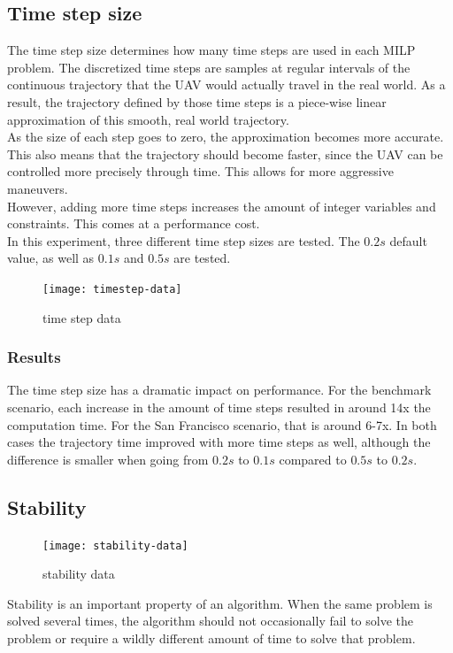 \subsection{Time step size}
The time step size determines how many time steps are used in each MILP problem. The discretized time steps are samples at regular intervals of the continuous trajectory that the UAV would actually travel in the real world. As a result, the trajectory defined by those time steps is a piece-wise linear approximation of this smooth, real world trajectory. \\
As the size of each step goes to zero, the approximation becomes more accurate. This also means that the trajectory should become faster, since the UAV can be controlled more precisely through time. This allows for more aggressive maneuvers. \\
However, adding more time steps increases the amount of integer variables and constraints. This comes at a performance cost. \\
In this experiment, three different time step sizes are tested. The $0.2s$ default value, as well as $0.1s$ and $0.5s$ are tested.
\begin{figure}[]
	\centering
	\texttt{[image: timestep-data]}
	\caption{time step data}
	\label{fig:timestep-data}
\end{figure}
\subsubsection{Results}
The time step size has a dramatic impact on performance. For the benchmark scenario, each increase in the amount of time steps resulted in around 14x the computation time. For the San Francisco scenario, that is around 6-7x. In both cases the trajectory time improved with more time steps as well, although the difference is smaller when going from $0.2s$ to $0.1s$ compared to $0.5s$ to $0.2s$.

\clearpage
\subsection{Stability}
\begin{figure}[]
	\centering
	\texttt{[image: stability-data]}
	\caption{stability data}
	\label{fig:stability-data}
\end{figure}
Stability is an important property of an algorithm. When the same problem is solved several times, the algorithm should not occasionally fail to solve the problem or require a wildly different amount of time to solve that problem. \\


